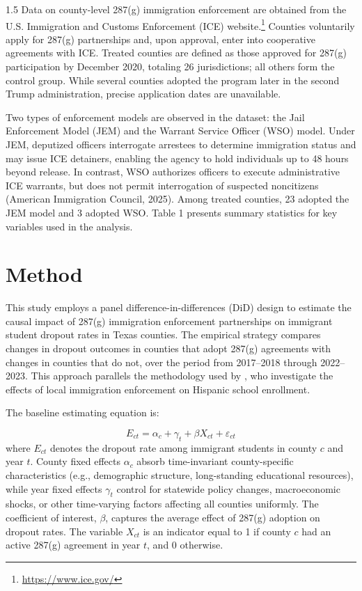 \documentclass[12pt]{article}
\begin{document}
\begin{spacing}{1.5}
Data on county-level 287(g) immigration enforcement are obtained from the U.S. {Immigration and Customs Enforcement (ICE) website}.\footnote{\url{https://www.ice.gov/}} Counties voluntarily apply for 287(g) partnerships and, upon approval, enter into cooperative agreements with ICE. Treated counties are defined as those approved for 287(g) participation by December 2020, totaling 26 jurisdictions; all others form the control group. While several counties adopted the program later in the second Trump administration, precise application dates are unavailable.

\medskip


Two types of enforcement models are observed in the dataset: the Jail Enforcement Model (JEM) and the Warrant Service Officer (WSO) model. Under JEM, deputized officers interrogate arrestees to determine immigration status and may issue ICE detainers, enabling the agency to hold individuals up to 48 hours beyond release. In contrast, WSO authorizes officers to execute administrative ICE warrants, but does not permit interrogation of suspected noncitizens (American Immigration Council, 2025). Among treated counties, 23 adopted the JEM model and 3 adopted WSO. Table 1 presents summary statistics for key variables used in the analysis.

\section{Method}
This study employs a panel difference-in-differences (DiD) design to estimate the causal impact of 287(g) immigration enforcement partnerships on immigrant student dropout rates in Texas counties. The empirical strategy compares changes in dropout outcomes in counties that adopt 287(g) agreements with changes in counties that do not, over the period from 2017–2018 through 2022–2023. This approach parallels the methodology used by \citet{dee2020}, who investigate the effects of local immigration enforcement on Hispanic school enrollment.

The baseline estimating equation is:

\begin{equation}
E_{ct} = \alpha_c + \gamma_t + \beta X_{ct} + \varepsilon_{ct}
\label{eq:baseline}
\end{equation}
where $E_{ct}$ denotes the dropout rate among immigrant students in county $c$ and year $t$. County fixed effects $\alpha_c$ absorb time-invariant county-specific characteristics (e.g., demographic structure, long-standing educational resources), while year fixed effects $\gamma_t$ control for statewide policy changes, macroeconomic shocks, or other time-varying factors affecting all counties uniformly. The coefficient of interest, $\beta$, captures the average effect of 287(g) adoption on dropout rates. The variable $X_{ct}$ is an indicator equal to 1 if county $c$ had an active 287(g) agreement in year $t$, and 0 otherwise.


\end{spacing}
\end{document}
